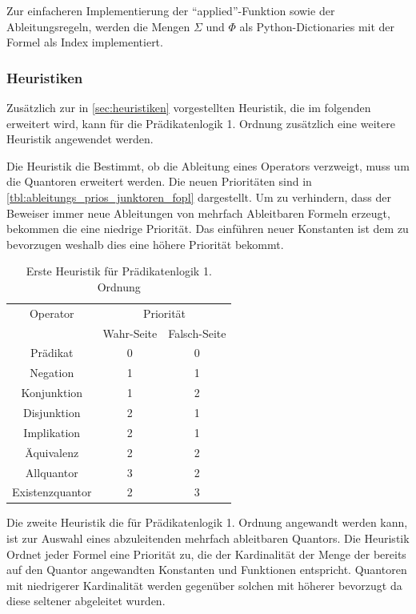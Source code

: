 Zur einfacheren Implementierung der ``applied''-Funktion sowie der Ableitungsregeln, werden die Mengen $\Sigma$ und $\Phi$ als Python-Dictionaries mit der Formel als Index implementiert.

\subsubsection{Heuristiken}
Zusätzlich zur in \autoref{sec:heuristiken} vorgestellten Heuristik, die im folgenden erweitert wird, kann für die Prädikatenlogik 1. Ordnung zusätzlich eine weitere Heuristik angewendet werden.

Die Heuristik die Bestimmt, ob die Ableitung eines Operators verzweigt, muss um die Quantoren erweitert werden. Die neuen Prioritäten sind in \autoref{tbl:ableitungs_prios_junktoren_fopl} dargestellt. Um zu verhindern, dass der Beweiser immer neue Ableitungen von mehrfach Ableitbaren Formeln erzeugt, bekommen die eine niedrige Priorität. Das einführen neuer Konstanten ist dem zu bevorzugen weshalb dies eine höhere Priorität bekommt.

\begin{table}[h]
\begin{center}
\begin{tabular}{|c|c|c|}
\hline
Operator & \multicolumn{2}{c|}{Priorität} \\
\cline{2-3}
 & Wahr-Seite & Falsch-Seite \\
\hline
Prädikat & 0 & 0 \\
Negation & 1 & 1 \\
Konjunktion & 1 & 2 \\
Disjunktion & 2 & 1 \\
Implikation & 2 & 1 \\
Äquivalenz & 2 & 2 \\
Allquantor & 3 & 2 \\
Existenzquantor & 2 & 3 \\
\hline
\end{tabular}
\end{center}
\caption{\label{tbl:ableitungs_prios_junktoren_fopl}Erste Heuristik für Prädikatenlogik 1. Ordnung}
\end{table}

Die zweite Heuristik die für Prädikatenlogik 1. Ordnung angewandt werden kann, ist zur Auswahl eines abzuleitenden mehrfach ableitbaren Quantors. Die Heuristik Ordnet jeder Formel eine Priorität zu, die der Kardinalität der Menge der bereits auf den Quantor angewandten Konstanten und Funktionen entspricht. Quantoren mit niedrigerer Kardinalität werden gegenüber solchen mit höherer bevorzugt da diese seltener abgeleitet wurden.



